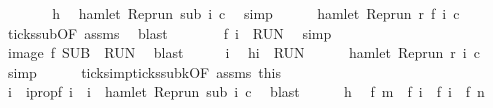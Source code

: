 \begin{isabellebody}
\ \ \ \ \isamarkupfalse%
\ \isamarkupfalse%
\ h\ \isamarkupfalse%
\ {\isacartoucheopen}hamlet\ {\isacharparenleft}{\isacharparenleft}Rep{\isacharunderscore}run\ sub{\isacharparenright}\ i\ c{\isacharparenright}{\isacartoucheclose}\ \isamarkupfalse%
\ simp\isanewline
\ \ \ \ \isamarkupfalse%
\ {\isacartoucheopen}hamlet\ {\isacharparenleft}{\isacharparenleft}Rep{\isacharunderscore}run\ r{\isacharparenright}\ {\isacharparenleft}f\ i{\isacharparenright}\ c{\isacharparenright}{\isacartoucheclose}\ \isamarkupfalse%
\ ticks{\isacharunderscore}sub{\isacharbrackleft}OF\ assms{\isacharbrackright}\ \isamarkupfalse%
\ blast\isanewline
\ \ \ \ \isamarkupfalse%
\ \isamarkupfalse%
\ {\isacartoucheopen}f\ i\ {\isasymin}\ {\isacharquery}RUN{\isacartoucheclose}\ \isamarkupfalse%
\ simp\isanewline
\ \ \isacommand{{\isacharbraceright}}\isamarkupfalse%
\ \isamarkupfalse%
\ {\isacartoucheopen}image\ f\ {\isacharquery}SUB\ {\isasymsubseteq}\ {\isacharquery}RUN{\isacartoucheclose}\ \isamarkupfalse%
\ blast\isanewline
{}\isamarkupfalse%
\isanewline
\ \ \isacommand{{\isacharbraceleft}}\isamarkupfalse%
\ \isamarkupfalse%
\ i\ \isamarkupfalse%
\ h{\isacharcolon}{\isacartoucheopen}i\ {\isasymin}\ {\isacharquery}RUN{\isacartoucheclose}\isanewline
\ \ \ \ \isamarkupfalse%
\ {\isacartoucheopen}hamlet\ {\isacharparenleft}{\isacharparenleft}Rep{\isacharunderscore}run\ r{\isacharparenright}\ i\ c{\isacharparenright}{\isacartoucheclose}\ \isamarkupfalse%
\ simp\isanewline
\ \ \ \ \isamarkupfalse%
\ ticks{\isacharunderscore}imp{\isacharunderscore}ticks{\isacharunderscore}subk{\isacharbrackleft}OF\ assms\ this{\isacharbrackright}\isanewline
\ \ \ \ \ \ \isamarkupfalse%
\ i\ \ i{}prop{\isacharcolon}{\isacartoucheopen}f\ i\ {\isacharequal}\ i\ {\isasymand}\ hamlet\ {\isacharparenleft}{\isacharparenleft}Rep{\isacharunderscore}run\ sub{\isacharparenright}\ i\ c{\isacharparenright}{\isacartoucheclose}\ \isamarkupfalse%
\ blast\isanewline
\ \ \ \ \isamarkupfalse%
\ h\ \isamarkupfalse%
\ {\isacartoucheopen}f\ m\ {\isacharless}\ f\ i\ {\isasymand}\ f\ i\ {\isacharless}\ f\ n{\isacartoucheclose}\ \isamarkupfalse%

\end{isabellebody}
